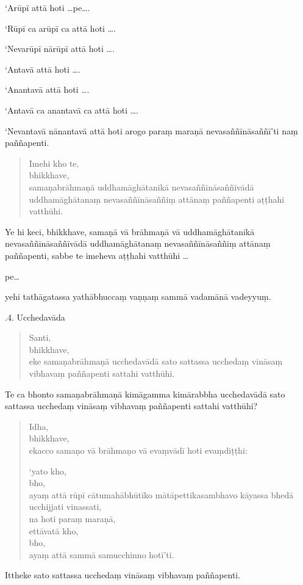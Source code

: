 \documentclass[11pt,twoside,openright]{book}
\begin{document}
\pstart
‘Arūpī attā hoti …pe….
\pend

\pstart
‘Rūpī ca arūpī ca attā hoti ….
\pend

\pstart
‘Nevarūpī nārūpī attā hoti ….
\pend

\pstart
‘Antavā attā hoti ….
\pend

\pstart
‘Anantavā attā hoti ….
\pend

\pstart
‘Antavā ca anantavā ca attā hoti ….
\pend

\pstart
‘Nevantavā nānantavā attā hoti arogo paraṃ maraṇā nevasaññīnāsaññī’ti naṃ paññapenti.
\pend

\begin{verse}
Imehi kho te,\\
\vin  bhikkhave,\\
\vin  samaṇabrāhmaṇā uddhamāghātanikā nevasaññīnāsaññīvādā uddhamāghātanaṃ nevasaññīnāsaññiṃ attānaṃ paññapenti aṭṭhahi vatthūhi.

\end{verse}
\pstart
Ye hi keci, bhikkhave, samaṇā vā brāhmaṇā vā uddhamāghātanikā nevasaññīnāsaññīvādā uddhamāghātanaṃ nevasaññīnāsaññiṃ attānaṃ paññapenti, sabbe te imeheva aṭṭhahi vatthūhi …
\pend

\pstart
pe…
\pend

\pstart
yehi tathāgatassa yathābhuccaṃ vaṇṇaṃ sammā vadamānā vadeyyuṃ.
\pend

.4. Ucchedavāda
\pend

\begin{verse}
Santi,\\
\vin  bhikkhave,\\
\vin  eke samaṇabrāhmaṇā ucchedavādā sato sattassa ucchedaṃ vināsaṃ vibhavaṃ paññapenti sattahi vatthūhi.

\end{verse}
\pstart
Te ca bhonto samaṇabrāhmaṇā kimāgamma kimārabbha ucchedavādā sato sattassa ucchedaṃ vināsaṃ vibhavaṃ paññapenti sattahi vatthūhi?
\pend

\begin{verse}
Idha,\\
\vin  bhikkhave,\\
\vin  ekacco samaṇo vā brāhmaṇo vā evaṃvādī hoti evaṃdiṭṭhi:

‘yato kho,\\
\vin  bho,\\
\vin  ayaṃ attā rūpī cātumahābhūtiko mātāpettikasambhavo kāyassa bhedā ucchijjati vinassati,\\
\vin  na hoti paraṃ maraṇā,\\
\vin  ettāvatā kho,\\
\vin  bho,\\
\vin  ayaṃ attā sammā samucchinno hotī’ti.

\end{verse}
\pstart
Ittheke sato sattassa ucchedaṃ vināsaṃ vibhavaṃ paññapenti.
\pend
\end{document}
